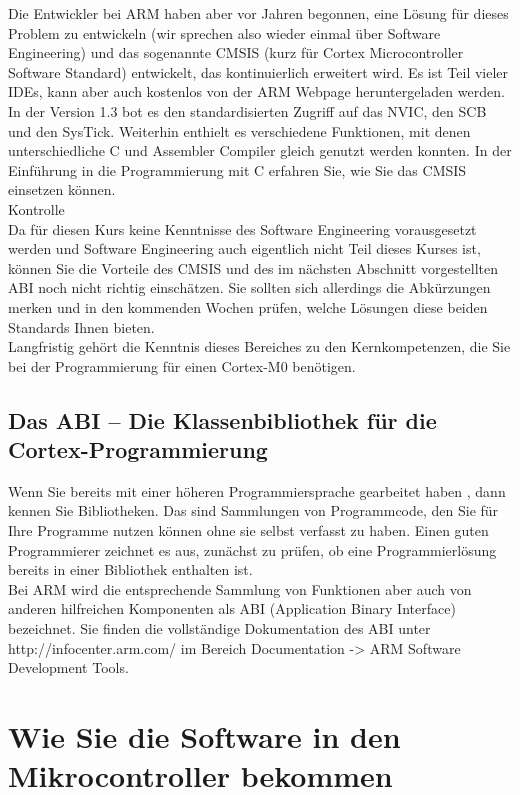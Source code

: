 Die Entwickler bei ARM haben aber vor Jahren begonnen, eine Lösung für dieses Problem zu entwickeln (wir sprechen also wieder einmal über Software Engineering) und das sogenannte CMSIS (kurz für Cortex Microcontroller Software Standard) entwickelt, das kontinuierlich erweitert wird. Es ist Teil vieler IDEs, kann aber auch kostenlos von der ARM Webpage heruntergeladen werden. In der Version 1.3  bot es den standardisierten Zugriff auf das NVIC, den SCB und den SysTick. Weiterhin enthielt es verschiedene Funktionen, mit denen unterschiedliche C und Assembler Compiler gleich genutzt werden konnten. In der Einführung in die Programmierung mit C erfahren Sie, wie Sie das CMSIS einsetzen können.\\

Kontrolle\\

Da für diesen Kurs keine Kenntnisse des Software Engineering vorausgesetzt werden und Software Engineering auch eigentlich nicht Teil dieses Kurses ist, können Sie die Vorteile des CMSIS und des im nächsten Abschnitt vorgestellten ABI noch nicht richtig einschätzen. Sie sollten sich allerdings die Abkürzungen merken und in den kommenden Wochen prüfen, welche Lösungen diese beiden Standards Ihnen bieten.\\

Langfristig gehört die Kenntnis dieses Bereiches zu den Kernkompetenzen, die Sie bei der Programmierung für einen Cortex-M0 benötigen.

\subsection{Das ABI – Die Klassenbibliothek für die Cortex-Programmierung}

Wenn Sie bereits mit einer höheren Programmiersprache gearbeitet haben , dann kennen Sie Bibliotheken. Das sind Sammlungen von Programmcode, den Sie für Ihre Programme nutzen können ohne sie selbst verfasst zu haben. Einen guten Programmierer zeichnet es aus, zunächst zu prüfen, ob eine Programmierlösung bereits in einer Bibliothek enthalten ist.\\

Bei ARM wird die entsprechende Sammlung von Funktionen aber auch von anderen hilfreichen Komponenten als ABI (Application Binary Interface) bezeichnet. Sie finden die vollständige Dokumentation des ABI unter http://infocenter.arm.com/ im Bereich Documentation -> ARM Software Development Tools.

\section{Wie Sie die Software in den Mikrocontroller bekommen}

